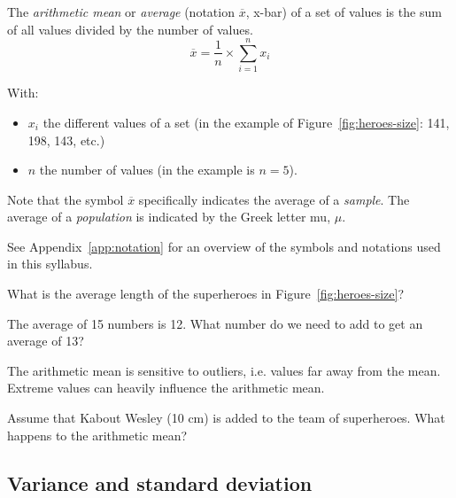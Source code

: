 \begin{definition}
    \label{def:mean}
    
    The \emph{arithmetic mean} or \emph{average} (notation $\overline{x}$, x-bar) of a set of values is the sum of all values divided by the number of values.
    \begin{equation}
    \overline{x} = \frac{1}{n} \times \sum_{i=1}^{n} x_{i}
    \label{eq:Mean}
    \end{equation}
    
    With:
    \begin{itemize}
        \item $x_{i}$ the different values of a set (in the example of Figure~\ref{fig:heroes-size}: 141, 198, 143, etc.)
        \item $n$ the number of values (in the example is $n = 5$).
    \end{itemize}
\end{definition}

\begin{remark}[!!]
    Note that the symbol $\overline{x}$ specifically indicates the average of a \emph{sample}.
    The average of a \emph{population} is indicated by the Greek letter mu, $\mu $.
    
    See Appendix~\ref{app:notation} for an overview of the symbols and notations used in this syllabus.
\end{remark}

\begin{exercise}
    What is the average length of the superheroes in Figure~\ref{fig:heroes-size}?
\end{exercise}

\begin{exercise}
    The average of 15 numbers is 12. What number do we need to add to get an average of 13?
\end{exercise}

\begin{exercise}
    The arithmetic mean is sensitive to outliers, i.e. values far away from the mean. Extreme values can heavily influence the arithmetic mean.
    
    Assume that Kabout Wesley (10 cm) is added to the team of superheroes. What happens to the arithmetic mean?
\end{exercise}

\subsection{Variance and standard deviation}
\label{ssec:variance-and-standard-deviation}

